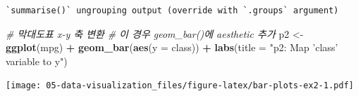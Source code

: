 \documentclass[
  11pt,
]{krantz}
\newenvironment{Shaded}{\begin{snugshade}}{\end{snugshade}}
\newcommand{\CommentTok}[1]{\textcolor[rgb]{0.37,0.37,0.37}{\textit{#1}}}
\newcommand{\DataTypeTok}[1]{\textcolor[rgb]{0.27,0.27,0.27}{#1}}
\newcommand{\KeywordTok}[1]{\textcolor[rgb]{0.27,0.27,0.27}{\textbf{#1}}}
\newcommand{\NormalTok}[1]{#1}
\newcommand{\OperatorTok}[1]{\textcolor[rgb]{0.43,0.43,0.43}{\textbf{#1}}}
\newcommand{\StringTok}[1]{\textcolor[rgb]{0.5,0.5,0.5}{#1}}
\begin{document}
\begin{Shaded}
\end{Shaded}

\begin{verbatim}
`summarise()` ungrouping output (override with `.groups` argument)
\end{verbatim}

\begin{Shaded}
\begin{Highlighting}[]
\CommentTok{# 막대도표 x-y 축 변환}
\CommentTok{# 이 경우 geom_bar()에 aesthetic 추가}
\NormalTok{p2 <-}\StringTok{ }\KeywordTok{ggplot}\NormalTok{(mpg) }\OperatorTok{+}\StringTok{ }
\StringTok{  }\KeywordTok{geom_bar}\NormalTok{(}\KeywordTok{aes}\NormalTok{(}\DataTypeTok{y =}\NormalTok{ class)) }\OperatorTok{+}\StringTok{ }
\StringTok{  }\KeywordTok{labs}\NormalTok{(}\DataTypeTok{title =} \StringTok{"p2: Map 'class' variable to y"}\NormalTok{)}
\end{Highlighting}
\end{Shaded}

\normalsize

\footnotesize

\texttt{[image: 05-data-visualization\_files/figure-latex/bar-plots-ex2-1.pdf]}

\normalsize

\footnotesize
\end{document}
